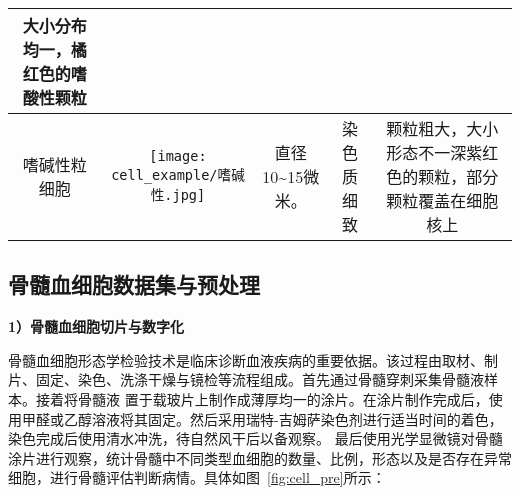 \begin{longtable}{ccccc}
  \multicolumn{1}{m{0.20\textwidth}}{大小分布均一，橘红色的嗜酸性颗粒}\\
  \midrule[0.5pt]
  嗜碱性粒细胞 & 
  \multicolumn{1}{m{0.15\textwidth}}{
  \begin{minipage}[b]{0.15\textwidth}
      \centering
      {\texttt{[image: cell\_example/嗜碱性.jpg]}}
  \end{minipage}} &  
  \multicolumn{1}{m{0.15\textwidth}}{直径10\textasciitilde15微米。} & 
  \multicolumn{1}{m{0.20\textwidth}}{染色质细致} & 
  \multicolumn{1}{m{0.20\textwidth}}{颗粒粗大，大小形态不一深紫红色的颗粒，部分颗粒覆盖在细胞核上}\\
  \bottomrule[1.5pt]
  \end{longtable}
\subsection{骨髓血细胞数据集与预处理}

\textbf{1）骨髓血细胞切片与数字化}

骨髓血细胞形态学检验技术是临床诊断血液疾病的重要依据。该过程由取材、制片、固定、染色、洗涤干燥与镜检等流程组成。首先通过骨髓穿刺采集骨髓液样本。接着将骨髓液
置于载玻片上制作成薄厚均一的涂片。在涂片制作完成后，使用甲醛或乙醇溶液将其固定。然后采用瑞特-吉姆萨染色剂进行适当时间的着色，染色完成后使用清水冲洗，待自然风干后以备观察。
最后使用光学显微镜对骨髓涂片进行观察，统计骨髓中不同类型血细胞的数量、比例，形态以及是否存在异常细胞，进行骨髓评估判断病情。具体如图~\ref{fig:cell_pre}所示：

